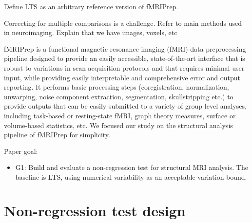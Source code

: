\documentclass{article}
\begin{document}
Define LTS as an arbitrary reference version of fMRIPrep.

Correcting for multiple comparisons is a challenge. Refer to main methods used
in neuroimaging. Explain that we have images, voxels, etc

fMRIPrep is a functional magnetic resonance imaging (fMRI) data preprocessing
pipeline designed to provide an easily accessible, state-of-the-art interface
that is robust to variations in scan acquisition protocols and that requires
minimal user input, while providing easily interpretable and comprehensive error
and output reporting. It performs basic processing steps (coregistration,
normalization, unwarping, noise component extraction, segmentation,
skullstripping etc.) to provide outputs that can be easily submitted to a
variety of group level analyses, including task-based or resting-state fMRI,
graph theory measures, surface or volume-based statistics, etc. We focused our
study on the structural analysis pipeline of fMRIPrep for simplicity.




Paper goal:
\begin{itemize}
    \item G1: Build and evaluate a non-regression test for structural MRI
          analysis. The baseline is LTS, using numerical variability as an acceptable
          variation bound.
\end{itemize}



\section{Non-regression test design}

\end{document}
